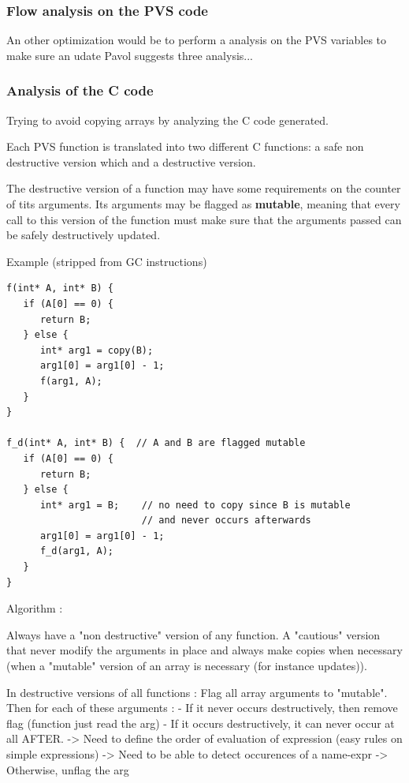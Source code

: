 \documentclass[12pt,a4paper,titlepage]{article}
\newcommand{\mut}{\textbf{mutable}}
\begin{document}
\subsubsection{Flow analysis on the PVS code}

An other optimization would be to perform a analysis on the PVS variables to make sure an udate
Pavol \cite{pavol} suggests three analysis...



\subsubsection{Analysis of the C code}
\label{Canalysis}



Trying to avoid copying arrays by analyzing the C code generated.

Each PVS function is translated into two different C functions: a safe non destructive version which and a destructive version.

The destructive version of a function may have some requirements on the counter of tits arguments. Its arguments may be flagged as \mut, meaning that every call to this version of the function must make sure that the arguments passed can be safely destructively updated.

Example (stripped from GC instructions)

\begin{lstlisting}
f(int* A, int* B) {
   if (A[0] == 0) {
      return B;
   } else {
      int* arg1 = copy(B);
      arg1[0] = arg1[0] - 1;
      f(arg1, A);
   }
}

f_d(int* A, int* B) {  // A and B are flagged mutable
   if (A[0] == 0) {
      return B;
   } else {
      int* arg1 = B;    // no need to copy since B is mutable
                        // and never occurs afterwards
      arg1[0] = arg1[0] - 1;
      f_d(arg1, A);
   }
}

\end{lstlisting}




Algorithm :

Always have a "non destructive" version of any function. A "cautious" version that never modify the arguments in place and always make copies when necessary (when a "mutable" version of an array is necessary (for instance updates)).

In destructive versions of all functions :
Flag all array arguments to "mutable".
Then for each of these arguments :
  - If it never occurs destructively, then remove flag
          (function just read the arg)
  - If it occurs destructively, it can never occur at all AFTER.
  -> Need to define the order of evaluation of expression
      (easy rules on simple expressions)
  -> Need to be able to detect occurences of a name-expr
  -> Otherwise, unflag the arg
\end{document}
